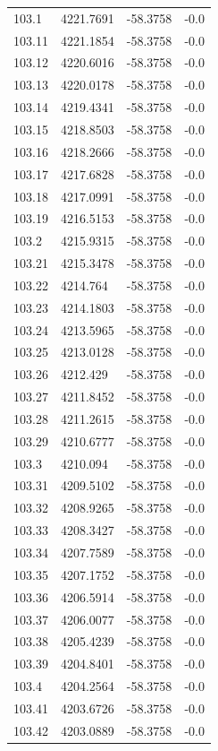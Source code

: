 \begin{table}[H]
\begin{tabular}{llll}
103.1 & 4221.7691 & -58.3758 & -0.0 \\
103.11 & 4221.1854 & -58.3758 & -0.0 \\
103.12 & 4220.6016 & -58.3758 & -0.0 \\
103.13 & 4220.0178 & -58.3758 & -0.0 \\
103.14 & 4219.4341 & -58.3758 & -0.0 \\
103.15 & 4218.8503 & -58.3758 & -0.0 \\
103.16 & 4218.2666 & -58.3758 & -0.0 \\
103.17 & 4217.6828 & -58.3758 & -0.0 \\
103.18 & 4217.0991 & -58.3758 & -0.0 \\
103.19 & 4216.5153 & -58.3758 & -0.0 \\
103.2 & 4215.9315 & -58.3758 & -0.0 \\
103.21 & 4215.3478 & -58.3758 & -0.0 \\
103.22 & 4214.764 & -58.3758 & -0.0 \\
103.23 & 4214.1803 & -58.3758 & -0.0 \\
103.24 & 4213.5965 & -58.3758 & -0.0 \\
103.25 & 4213.0128 & -58.3758 & -0.0 \\
103.26 & 4212.429 & -58.3758 & -0.0 \\
103.27 & 4211.8452 & -58.3758 & -0.0 \\
103.28 & 4211.2615 & -58.3758 & -0.0 \\
103.29 & 4210.6777 & -58.3758 & -0.0 \\
103.3 & 4210.094 & -58.3758 & -0.0 \\
103.31 & 4209.5102 & -58.3758 & -0.0 \\
103.32 & 4208.9265 & -58.3758 & -0.0 \\
103.33 & 4208.3427 & -58.3758 & -0.0 \\
103.34 & 4207.7589 & -58.3758 & -0.0 \\
103.35 & 4207.1752 & -58.3758 & -0.0 \\
103.36 & 4206.5914 & -58.3758 & -0.0 \\
103.37 & 4206.0077 & -58.3758 & -0.0 \\
103.38 & 4205.4239 & -58.3758 & -0.0 \\
103.39 & 4204.8401 & -58.3758 & -0.0 \\
103.4 & 4204.2564 & -58.3758 & -0.0 \\
103.41 & 4203.6726 & -58.3758 & -0.0 \\
103.42 & 4203.0889 & -58.3758 & -0.0 \\

\end{tabular}
\end{table}
